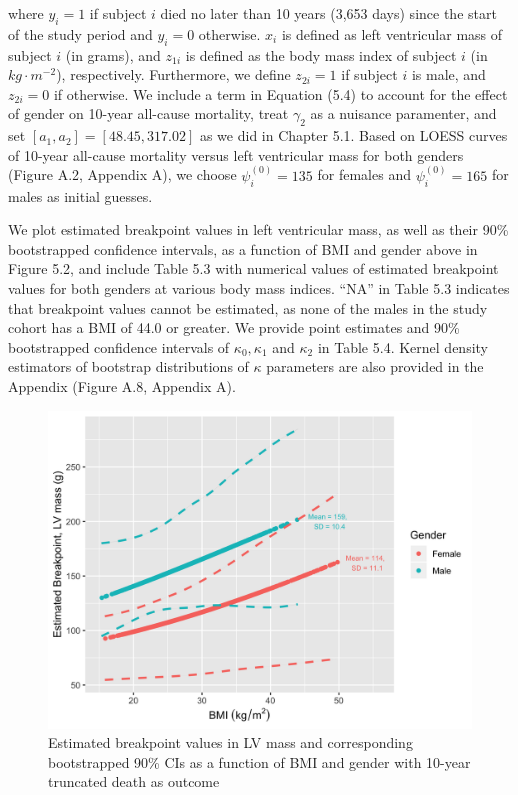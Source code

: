 \documentclass [12pt, proquest] {uwthesis}[2016/11/22]
\begin{document}
where $y_i = 1$ if subject $i$ died no later than 10 years (3,653 days) since the start of the study period and $y_i = 0$ otherwise. $x_i$ is defined as left ventricular mass of subject $i$ (in grams), and $z_{1i}$ is defined as the body mass index of subject $i$ (in $kg \cdot m^{-2}$), respectively.  Furthermore, we define $z_{2i} = 1$ if subject $i$ is male, and $z_{2i} = 0$ if otherwise. We include a term in Equation (5.4) to account for the effect of gender on 10-year all-cause mortality, treat $\gamma_2$ as a nuisance paramenter, and set $[a_1, a_2] = [48.45, 317.02]$ as we did in Chapter 5.1. Based on LOESS curves of 10-year all-cause mortality versus left ventricular mass for both genders (Figure A.2, Appendix A), we choose $\psi_i^{(0)} = 135$ for females and $\psi_i^{(0)} = 165$ for males as initial guesses.

We plot estimated breakpoint values in left ventricular mass, as well as their 90\% bootstrapped confidence intervals, as a function of BMI and gender above in Figure 5.2, and include Table 5.3 with numerical values of estimated breakpoint values for both genders at various body mass indices. ``NA'' in Table 5.3 indicates that breakpoint values cannot be estimated, as none of the males in the study cohort has a BMI of 44.0 or greater. We provide point estimates and 90\% bootstrapped confidence intervals of $\kappa_0, \kappa_1$ and $\kappa_2$ in Table 5.4. Kernel density estimators of bootstrap distributions of $\kappa$ parameters are also provided in the Appendix (Figure A.8, Appendix A).

\begin{figure}
    \centering
    \includegraphics[width = 6 in]{Plot5_2.png}
    \caption{Estimated breakpoint values in LV mass and corresponding bootstrapped 90\% CIs as a function of BMI and gender with 10-year truncated death as outcome}
\end{figure}
\end{document}
